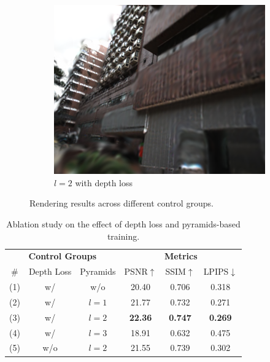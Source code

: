 \documentclass[lettersize,journal]{IEEEtran}
\begin{document}
\begin{figure}
\begin{subfigure}{0.15\textwidth}
        \label{fig:ablationwd3}
    \end{subfigure}
    \hspace{0.0001\textwidth} %
    \begin{subfigure}{0.15\textwidth}
        \includegraphics[width=\linewidth]{image/ablation/wd2.png}
        \caption{$l=2$ with depth loss}
        \label{fig:ablationwd2}
    \end{subfigure}
    \hspace{0.0001\textwidth} %
    \caption{Rendering results across different control groups.}
    \label{fig:ablation}
\end{figure}

\begin{table}
    \raggedright %
    \renewcommand{\arraystretch}{1.0} %
    \setlength{\tabcolsep}{10pt} %
    \caption{Ablation study on the effect of depth loss and pyramids-based training.}
    \label{tab:ablation}
    \begin{tabular}{@{}cccccc@{}}
        \toprule
        \multicolumn{3}{c}{\textbf{Control Groups}} & \multicolumn{3}{c}{\textbf{Metrics}} \\
        \cmidrule(lr){1-3} \cmidrule(lr){4-6}
        \# & Depth Loss & Pyramids & PSNR$\uparrow$ & SSIM$\uparrow$ & LPIPS$\downarrow$ \\
        \midrule
        (1) & w/ & w/o & 20.40 & 0.706 & 0.318 \\
        (2) & w/ & $l=1$ & 21.77 & 0.732 & 0.271 \\
        (3) & w/ & $l=2$ & \textbf{22.36} & \textbf{0.747} & \textbf{0.269} \\
        (4) & w/ & $l=3$ & 18.91 & 0.632 & 0.475 \\
        (5) & w/o & $l=2$ & 21.55 & 0.739 & 0.302 \\
        \bottomrule
    \end{tabular}
    \captionsetup{justification=centering, labelsep=colon} %
\end{table}
\end{document}
